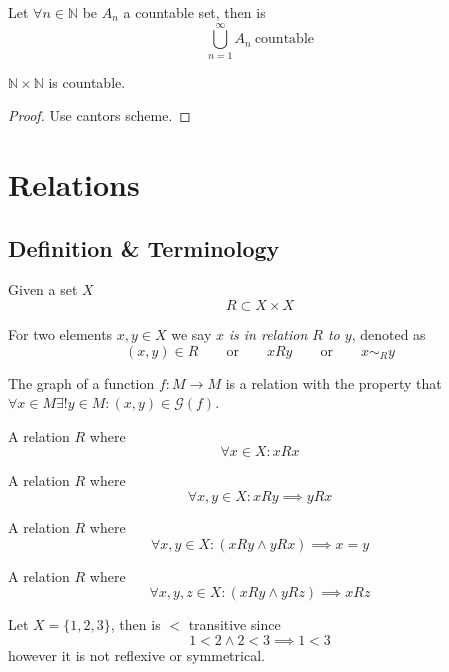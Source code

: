 \begin{proposition}
   Let \(\forall n \in \mathbb{N}\) be \(A_n\) a countable set, then is
   \[\bigcup_{n=1}^{\infty} A_n~\text{countable}\]
\end{proposition}

\begin{proposition}
   \(\mathbb{N} \times \mathbb{N}\) is countable.
\end{proposition}
\begin{proof}
   Use cantors scheme.
\end{proof}

\section{Relations}
\subsection{Definition \& Terminology}
\begin{definition}
   Given a set \(X\)
   \[R \subset X \times X\]
\end{definition}
\begin{remark}[Terminology]
   For two elements \(x, y \in X\) we say \(x\) \emph{is in relation \(R\) to \(y\)}, denoted as
   \[(x, y) \in R \qquad\text{or}\qquad xRy \qquad\text{or}\qquad x \sim_R y\]
\end{remark}
\begin{example}
   The graph of a function \(f: M \to M\) is a relation with the property that \(\forall x \in M \exists! y \in M: (x, y) \in \mathcal{G}(f)\).
\end{example}

\begin{definition}
   A relation \(R\) where
   \[\forall x \in X: xRx\]
\end{definition}

\begin{definition}
   A relation \(R\) where
   \[\forall x, y \in X: xRy \implies yRx\]
\end{definition}

\begin{definition}
   A relation \(R\) where
   \[\forall x, y \in X: (xRy \land yRx) \implies x = y\]
\end{definition}

\begin{definition}
   A relation \(R\) where
   \[\forall x, y, z \in X: (xRy \land yRz) \implies xRz\]
\end{definition}
\begin{example}
   Let \(X = \{1, 2, 3\}\), then is \(<\) transitive since
   \[1 < 2 \land 2 < 3 \implies 1 < 3\]
   however it is not reflexive or symmetrical.
\end{example}

